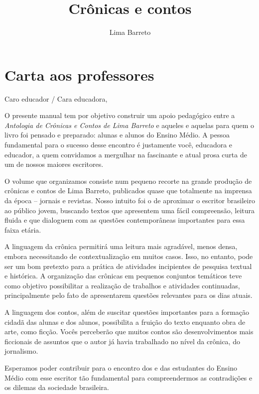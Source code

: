 \documentclass{article}
\newcommand{\AutorLivro}{Lima Barreto}
\newcommand{\TituloLivro}{Crônicas e contos}
\newcommand{\colaborador}{\textit{Fulano de Tal} é uma pessoa incrível e vai fazer um bom serviço.}
\begin{document}
\title{\TituloLivro}
\author{\AutorLivro}
\def\authornotes{\colaborador}

\date{}
\maketitle
\tableofcontents




\section{Carta aos professores}

Caro educador / Cara educadora,\\\bigskip

O presente manual tem por objetivo construir um apoio pedagógico entre a
\emph{Antologia de Crônicas e Contos de Lima Barreto} e aqueles e
aquelas para quem o livro foi pensado e preparado: alunas e alunos do
Ensino Médio. A pessoa fundamental para o sucesso desse encontro é
justamente você, educadora e educador, a quem convidamos a mergulhar na
fascinante e atual prosa curta de um de nossos maiores escritores.

O volume que organizamos consiste num pequeno recorte na grande produção
de crônicas e contos de Lima Barreto, publicados quase que totalmente na
imprensa da época -- jornais e revistas. Nosso intuito foi o de
aproximar o escritor brasileiro ao público jovem, buscando textos que
apresentem uma fácil compreensão, leitura fluida e que dialoguem com as
questões contemporâneas importantes para essa faixa etária.

A linguagem da crônica permitirá uma leitura mais agradável, menos
densa, embora necessitando de contextualização em muitos casos. Isso, no
entanto, pode ser um bom pretexto para a prática de atividades
incipientes de pesquisa textual e histórica. A organização das crônicas
em pequenos conjuntos temáticos teve como objetivo possibilitar a
realização de trabalhos e atividades continuadas, principalmente pelo
fato de apresentarem questões relevantes para os dias atuais.

A linguagem dos contos, além de suscitar questões importantes para a
formação cidadã das alunas e dos alunos, possibilita a fruição do texto
enquanto obra de arte, como ficção. Vocês perceberão que muitos contos
são desenvolvimentos mais ficcionais de assuntos que o autor já havia
trabalhado no nível da crônica, do jornalismo.

Esperamos poder contribuir para o encontro dos e das estudantes do
Ensino Médio com esse escritor tão fundamental para compreendermos as
contradições e os dilemas da sociedade brasileira.
\end{document}
